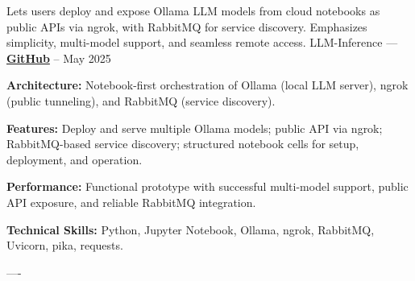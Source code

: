 \begin{cventries}


\cventry
    {Lets users deploy and expose Ollama LLM models from cloud notebooks
    as public APIs via ngrok, with RabbitMQ for service discovery.
    Emphasizes simplicity, multi-model support, and seamless remote access.}
    {LLM-Inference — \href{https://github.com/ibrhmahmd/Inference-Engine}{\color{midnightblue}\textbf{GitHub}} \textrm{\faArrowRight}}
    {--}
    {May 2025}
    {
      \begin{cvitems}
        \item \textbf{Architecture:}{ Notebook-first orchestration of Ollama (local LLM server), ngrok (public tunneling), and RabbitMQ (service discovery).}
        \item \textbf{Features:}{ Deploy and serve multiple Ollama models; public API via ngrok; RabbitMQ-based service discovery; structured notebook cells for setup, deployment, and operation.}
        \item \textbf{Performance:}{ Functional prototype with successful multi-model support, public API exposure, and reliable RabbitMQ integration.}
        \item \textbf{Technical Skills:}{ Python, Jupyter Notebook, Ollama, ngrok, RabbitMQ, Uvicorn, pika, requests.}
      \end{cvitems}
    }
    \begin{singlespace}
----
\end{singlespace}




\end{cventries}
